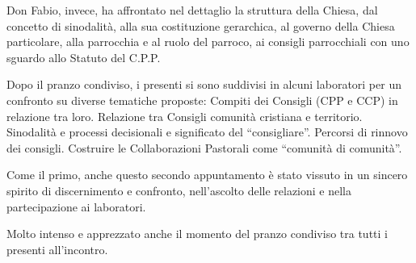 Don Fabio, invece, ha affrontato nel dettaglio la struttura della Chiesa, dal concetto di sinodalità, alla sua costituzione gerarchica, al governo della Chiesa particolare, alla parrocchia e al ruolo del parroco, ai consigli parrocchiali con uno sguardo allo Statuto del C.P.P.

Dopo il pranzo condiviso, i presenti si sono suddivisi in alcuni laboratori per un confronto su diverse tematiche proposte: Compiti dei Consigli (CPP e CCP) in relazione tra loro. Relazione tra Consigli comunità cristiana e territorio. Sinodalità e processi decisionali e significato del “consigliare”. Percorsi di rinnovo dei consigli. Costruire le Collaborazioni Pastorali come “comunità di comunità”.

Come il primo, anche questo secondo appuntamento è stato vissuto in un sincero spirito di discernimento e confronto, nell’ascolto delle relazioni e nella partecipazione ai laboratori.

Molto intenso e apprezzato anche il momento del pranzo condiviso tra tutti i presenti all’incontro.

